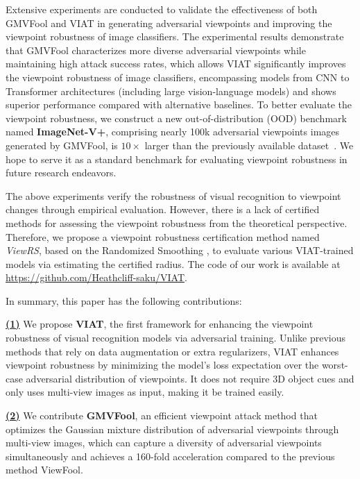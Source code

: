 \documentclass[10pt,journal,compsoc]{IEEEtran}
\begin{document}
Extensive experiments are conducted to validate the effectiveness of both GMVFool and VIAT in generating adversarial viewpoints and improving the viewpoint robustness of image classifiers. The experimental results demonstrate that GMVFool characterizes more diverse adversarial viewpoints while maintaining high attack success rates, which allows VIAT significantly improves the viewpoint robustness of image classifiers, encompassing models from CNN to Transformer architectures (including large vision-language models) and shows superior performance compared with alternative baselines. To better evaluate the viewpoint robustness, we construct a new out-of-distribution (OOD) benchmark named \textbf{ImageNet-V+}, comprising nearly 100k adversarial viewpoints images generated by GMVFool, is $10\times$ larger than the previously available dataset~\cite{dong2022viewfool}. We hope to serve it as a standard benchmark for evaluating viewpoint robustness in future research endeavors.

The above experiments verify the robustness of visual recognition to viewpoint changes through empirical evaluation. However, there is a lack of certified methods for assessing the viewpoint robustness from the theoretical perspective. Therefore, we propose a viewpoint robustness certification method named \emph{ViewRS}, based on the Randomized Smoothing \cite{cohen2019certified}, to evaluate various VIAT-trained models via estimating the certified radius. The code of our work is available at \url{https://github.com/Heathcliff-saku/VIAT}.

In summary, this paper has the following contributions:

\textbf{\underline{(1)}} We propose \textbf{VIAT}, the first framework for enhancing the viewpoint robustness of visual recognition models via adversarial training. Unlike previous methods that rely on data augmentation\cite{madan2020capability} or extra regularizers\cite{yang2019invariance}, VIAT enhances viewpoint robustness by minimizing the model's loss expectation over the worst-case adversarial distribution of viewpoints. It does not require 3D object cues and only uses multi-view images as input, making it be trained easily.

\textbf{\underline{(2)}} We contribute \textbf{GMVFool}, an efficient viewpoint attack method that optimizes the Gaussian mixture distribution of adversarial viewpoints through multi-view images, which can capture a diversity of adversarial viewpoints simultaneously and achieves a 160-fold acceleration compared to the previous method ViewFool.
\end{document}

